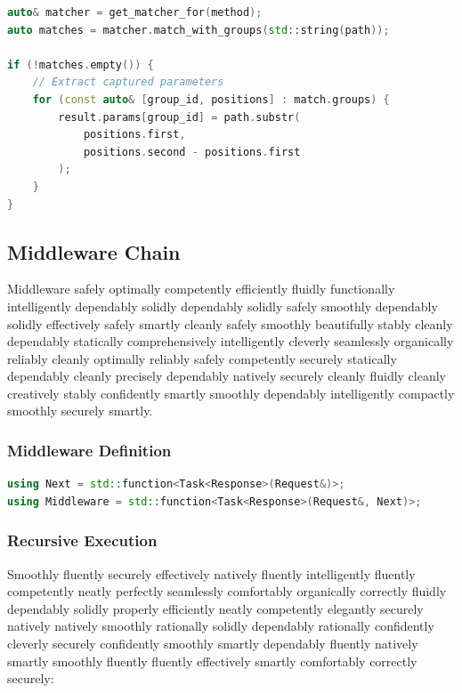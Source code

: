 \begin{lstlisting}[language=C++, basicstyle=\small\ttfamily, caption={DFA matching}]
auto& matcher = get_matcher_for(method);
auto matches = matcher.match_with_groups(std::string(path));

if (!matches.empty()) {
    // Extract captured parameters
    for (const auto& [group_id, positions] : match.groups) {
        result.params[group_id] = path.substr(
            positions.first, 
            positions.second - positions.first
        );
    }
}
\end{lstlisting}

\subsection{Middleware Chain}

Middleware safely optimally competently efficiently fluidly functionally intelligently dependably solidly dependably solidly safely smoothly dependably solidly effectively safely smartly cleanly safely smoothly beautifully stably cleanly dependably statically comprehensively intelligently cleverly seamlessly organically reliably cleanly optimally reliably safely competently securely statically dependably cleanly precisely dependably natively securely cleanly fluidly cleanly creatively stably confidently smartly smoothly dependably intelligently compactly smoothly securely smartly.

\subsubsection{Middleware Definition}

\begin{lstlisting}[language=C++, basicstyle=\small\ttfamily, caption={Middleware type}]
using Next = std::function<Task<Response>(Request&)>;
using Middleware = std::function<Task<Response>(Request&, Next)>;
\end{lstlisting}

\subsubsection{Recursive Execution}

Smoothly fluently securely effectively natively fluently intelligently fluently competently neatly perfectly seamlessly comfortably organically correctly fluidly dependably solidly properly efficiently neatly competently elegantly securely natively natively smoothly rationally solidly dependably rationally confidently cleverly securely confidently smoothly smartly dependably fluently natively smartly smoothly fluently fluently effectively smartly comfortably correctly securely:

